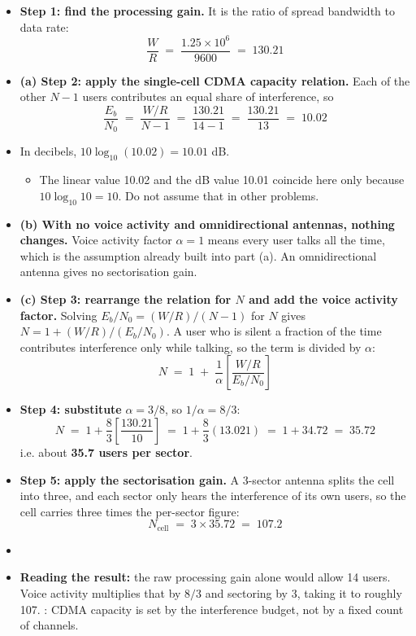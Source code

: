 \begin{itemize}
  \item \textbf{Step 1: find the processing gain.} It is the ratio of spread bandwidth to data
        rate:
        \[ \frac{W}{R} \;=\; \frac{1.25 \times 10^6}{9600} \;=\; 130.21 \]
  \item \textbf{(a) Step 2: apply the single-cell CDMA capacity relation.} Each of the other
        $N-1$ users contributes an equal share of interference, so
        \[ \frac{E_b}{N_0} \;=\; \frac{W/R}{N - 1} \;=\; \frac{130.21}{14 - 1}
           \;=\; \frac{130.21}{13} \;=\; 10.02 \]
  \item In decibels, $10\log_{10}(10.02) = 10.01$ dB. 
  \begin{itemize}
    \item {\color{sub}The linear value 10.02 and the dB value 10.01 coincide here only because
          $10\log_{10} 10 = 10$. Do not assume that in other problems.}
  \end{itemize}
  \item \textbf{(b) With no voice activity and omnidirectional antennas, nothing changes.}
        Voice activity factor $\alpha = 1$ means every user talks all the time, which is the
        assumption already built into part (a). An omnidirectional antenna gives no
        sectorisation gain. 
  \item \textbf{(c) Step 3: rearrange the relation for $N$ and add the voice activity factor.}
        Solving $E_b/N_0 = (W/R)/(N-1)$ for $N$ gives $N = 1 + (W/R)/(E_b/N_0)$. A user who is
        silent a fraction of the time contributes interference only while talking, so the term
        is divided by $\alpha$:
        \[ N \;=\; 1 \;+\; \frac{1}{\alpha}\left[\frac{W/R}{E_b/N_0}\right] \]
  \item \textbf{Step 4: substitute} $\alpha = 3/8$, so $1/\alpha = 8/3$:
        \[ N \;=\; 1 + \frac{8}{3}\left[\frac{130.21}{10}\right]
           \;=\; 1 + \frac{8}{3}(13.021) \;=\; 1 + 34.72 \;=\; 35.72 \]
        i.e. about \textbf{35.7 users per sector}.
  \item \textbf{Step 5: apply the sectorisation gain.} A 3-sector antenna splits the cell into
        three, and each sector only hears the interference of its own users, so the cell carries
        three times the per-sector figure:
        \[ N_{\text{cell}} \;=\; 3 \times 35.72 \;=\; 107.2 \]
  \item {}
  \item \textbf{Reading the result:} the raw processing gain alone would allow 14 users. Voice
        activity multiplies that by $8/3$ and sectoring by 3, taking it to roughly 107.
        : CDMA
        capacity is set by the interference budget, not by a fixed count of channels.
\end{itemize}
